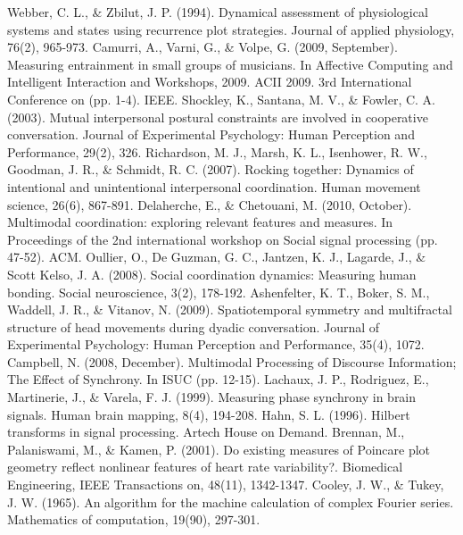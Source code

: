 \documentclass[12pt]{article}
\begin{document}
\begin{thebibliography}{}
    Webber, C. L., \& Zbilut, J. P. (1994). Dynamical assessment of physiological systems and states using recurrence plot strategies. Journal of applied physiology, 76(2), 965-973.
    Camurri, A., Varni, G., \& Volpe, G. (2009, September). Measuring entrainment in small groups of musicians. In Affective Computing and Intelligent Interaction and Workshops, 2009. ACII 2009. 3rd International Conference on (pp. 1-4). IEEE.
    Shockley, K., Santana, M. V., \& Fowler, C. A. (2003). Mutual interpersonal postural constraints are involved in cooperative conversation. Journal of Experimental Psychology: Human Perception and Performance, 29(2), 326.
    Richardson, M. J., Marsh, K. L., Isenhower, R. W., Goodman, J. R., \& Schmidt, R. C. (2007). Rocking together: Dynamics of intentional and unintentional interpersonal coordination. Human movement science, 26(6), 867-891.
    Delaherche, E., \& Chetouani, M. (2010, October). Multimodal coordination: exploring relevant features and measures. In Proceedings of the 2nd international workshop on Social signal processing (pp. 47-52). ACM.
    Oullier, O., De Guzman, G. C., Jantzen, K. J., Lagarde, J., \& Scott Kelso, J. A. (2008). Social coordination dynamics: Measuring human bonding. Social neuroscience, 3(2), 178-192.
    Ashenfelter, K. T., Boker, S. M., Waddell, J. R., \& Vitanov, N. (2009). Spatiotemporal symmetry and multifractal structure of head movements during dyadic conversation. Journal of Experimental Psychology: Human Perception and Performance, 35(4), 1072.
    Campbell, N. (2008, December). Multimodal Processing of Discourse Information; The Effect of Synchrony. In ISUC (pp. 12-15).
    Lachaux, J. P., Rodriguez, E., Martinerie, J., \& Varela, F. J. (1999). Measuring phase synchrony in brain signals. Human brain mapping, 8(4), 194-208.
    Hahn, S. L. (1996). Hilbert transforms in signal processing. Artech House on Demand.
    Brennan, M., Palaniswami, M., \& Kamen, P. (2001). Do existing measures of Poincare plot geometry reflect nonlinear features of heart rate variability?. Biomedical Engineering, IEEE Transactions on, 48(11), 1342-1347.
    Cooley, J. W., \& Tukey, J. W. (1965). An algorithm for the machine calculation of complex Fourier series. Mathematics of computation, 19(90), 297-301.
\end{thebibliography}
\end{document}

